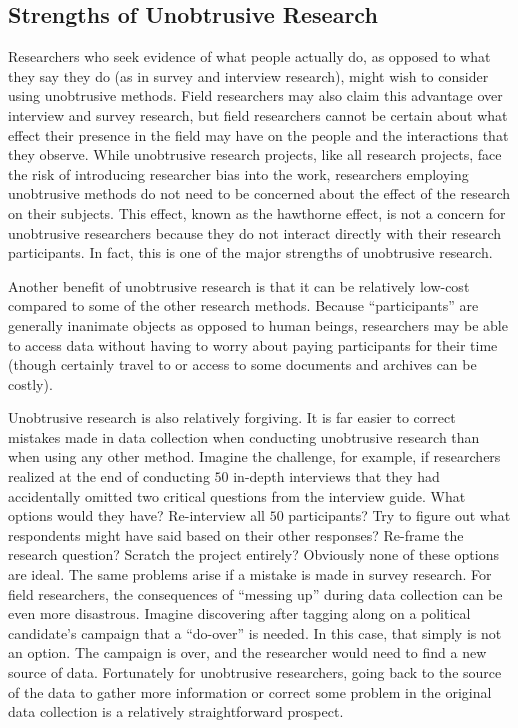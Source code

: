\subsection{Strengths of Unobtrusive Research}

Researchers who seek evidence of what people actually do, as opposed to what they say they do (as in survey and interview research), might wish to consider using unobtrusive methods. Field researchers may also claim this advantage over interview and survey research, but field researchers cannot be certain about what effect their presence in the field may have on the people and the interactions that they observe. While unobtrusive research projects, like all research projects, face the risk of introducing researcher bias into the work, researchers employing unobtrusive methods do not need to be concerned about the effect of the research on their subjects. This effect, known as the \Gls{hawthorne} effect, is not a concern for unobtrusive researchers because they do not interact directly with their research participants. In fact, this is one of the major strengths of unobtrusive research.

Another benefit of unobtrusive research is that it can be relatively low-cost compared to some of the other research methods. Because ``participants'' are generally inanimate objects as opposed to human beings, researchers may be able to access data without having to worry about paying participants for their time (though certainly travel to or access to some documents and archives can be costly).

Unobtrusive research is also relatively forgiving. It is far easier to correct mistakes made in data collection when conducting unobtrusive research than when using any other method. Imagine the challenge, for example, if researchers realized at the end of conducting $ 50 $ in-depth interviews that they had accidentally omitted two critical questions from the interview guide. What options would they have? Re-interview all $ 50 $ participants? Try to figure out what respondents might have said based on their other responses? Re-frame the research question? Scratch the project entirely? Obviously none of these options are ideal. The same problems arise if a mistake is made in survey research. For field researchers, the consequences of ``messing up'' during data collection can be even more disastrous. Imagine discovering after tagging along on a political candidate's campaign that a ``do-over'' is needed. In this case, that simply is not an option. The campaign is over, and the researcher would need to find a new source of data. Fortunately for unobtrusive researchers, going back to the source of the data to gather more information or correct some problem in the original data collection is a relatively straightforward prospect.

